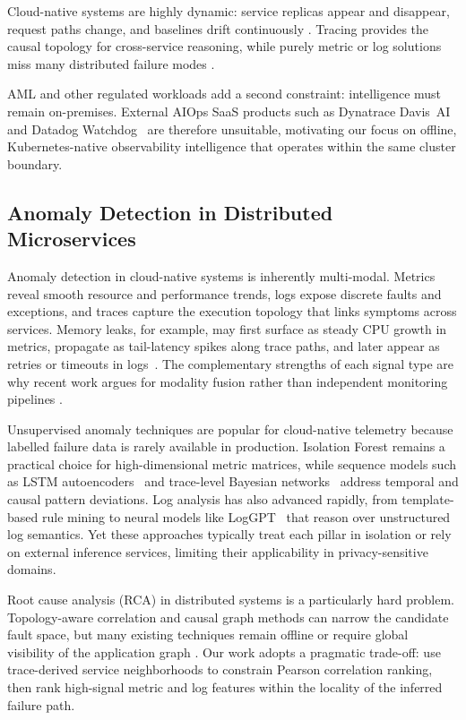 \documentclass[a4paper]{lipics-v2021}
\begin{document}
Cloud-native systems are highly dynamic: service replicas appear and
disappear, request paths change, and baselines drift continuously
\cite{soldani2022anomaly}. Tracing provides the causal topology for
cross-service reasoning, while purely metric or log solutions miss many
distributed failure modes \cite{sigelman2010dapper,opentelemetry2023}.

AML and other regulated workloads add a second constraint: intelligence must remain
on-premises. External AIOps SaaS products such as Dynatrace Davis~AI~\cite{dynatrace2023}
and Datadog Watchdog~\cite{datadog2023} are therefore unsuitable, motivating our
focus on offline, Kubernetes-native observability intelligence that operates within
the same cluster boundary.

\subsection{Anomaly Detection in Distributed Microservices}

Anomaly detection in cloud-native systems is inherently multi-modal. Metrics reveal
smooth resource and performance trends, logs expose discrete faults and exceptions,
and traces capture the execution topology that links symptoms across services.
Memory leaks, for example, may first surface as steady CPU growth in metrics,
propagate as tail-latency spikes along trace paths, and later appear as retries or
timeouts in logs~\cite{soldani2022anomaly}. The complementary strengths of each
signal type are why recent work argues for modality fusion rather than independent
monitoring pipelines \cite{han2024holistic,lomio2022anomaly}.

Unsupervised anomaly techniques are popular for cloud-native telemetry because
labelled failure data is rarely available in production. Isolation Forest
\cite{liu2012isolation} remains a practical choice for high-dimensional metric
matrices, while sequence models such as LSTM autoencoders~\cite{malhotra2016lstm}
and trace-level Bayesian networks~\cite{liu2020unsupervised} address temporal and
causal pattern deviations. Log analysis has also advanced rapidly, from template-
based rule mining to neural models like LogGPT~\cite{qi2023loggpt} that reason over
unstructured log semantics. Yet these approaches typically treat each pillar in
isolation or rely on external inference services, limiting their applicability in
privacy-sensitive domains.

Root cause analysis (RCA) in distributed systems is a particularly hard problem.
Topology-aware correlation and causal graph methods can narrow the candidate fault
space, but many existing techniques remain offline or require global visibility of
the application graph \cite{han2024holistic}. Our work adopts a pragmatic trade-off:
use trace-derived service neighborhoods to constrain Pearson correlation ranking,
then rank high-signal metric and log features within the locality of the inferred
failure path.
\end{document}
